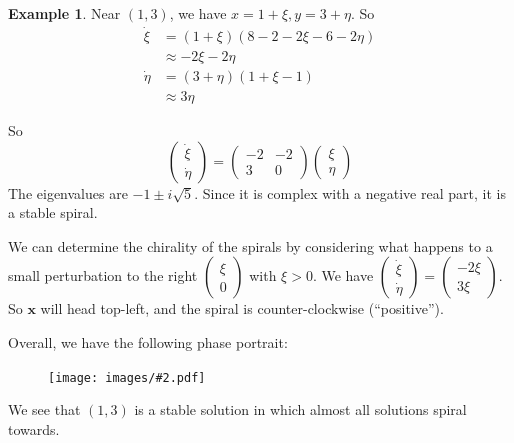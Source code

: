 \documentclass[a4paper]{article}
\theoremstyle{definition}
\newtheorem*{eg}{Example}
\newcommand{\mb}[1]{\mathbf{#1}}
\newcommand{\img}[2][]{\begin{figure}[ht]\centering\texttt{[image: images/\#2.pdf]}\end{figure}}
\DeclareMathOperator\re{Re}
\begin{document}
\begin{eg}
Near $(1, 3)$, we have $x = 1 + \xi, y = 3 + \eta$. So
\begin{align*}
  \dot \xi &= (1 + \xi)(8 - 2 - 2\xi - 6 - 2\eta)\\
  &\approx -2\xi - 2\eta\\
  \dot\eta &= (3 + \eta)(1 + \xi - 1)\\
  &\approx 3\eta
\end{align*}

So
\[
\begin{pmatrix}
  \dot\xi\\\dot\eta
\end{pmatrix} = 
\begin{pmatrix}
  -2 & -2\\
  3 & 0
\end{pmatrix}
\begin{pmatrix}
  \xi\\\eta
\end{pmatrix}
\]
The eigenvalues are $- 1\pm i\sqrt{5}$. Since it is complex with a negative real part, it is a stable spiral.

We can determine the chirality of the spirals by considering what happens to a small perturbation to the right $
\begin{pmatrix}
  \xi\\0
\end{pmatrix}$ with $\xi > 0$. We have $
\begin{pmatrix}
  \dot\xi\\\dot\eta
\end{pmatrix} = 
\begin{pmatrix}
  -2\xi\\3\xi
\end{pmatrix}$. So $\mb{x}$ will head top-left, and the spiral is counter-clockwise (``positive'').






Overall, we have the following phase portrait:
\img[width=180pt]{de_30}

We see that $(1, 3)$ is a stable solution in which almost all solutions spiral towards. 
\end{eg}
\end{document}

